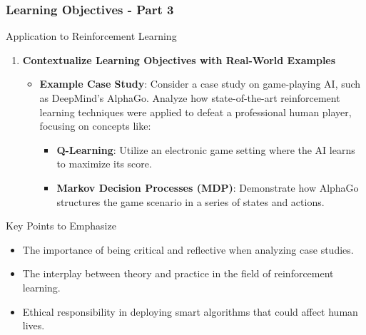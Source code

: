 \documentclass[aspectratio=169]{beamer}
\begin{document}
\begin{frame}[fragile]
    \frametitle{Learning Objectives - Part 3}
    \begin{block}{Application to Reinforcement Learning}
        \begin{enumerate}
            \item \textbf{Contextualize Learning Objectives with Real-World Examples}
                \begin{itemize}
                    \item \textbf{Example Case Study}: Consider a case study on game-playing AI, such as DeepMind’s AlphaGo. Analyze how state-of-the-art reinforcement learning techniques were applied to defeat a professional human player, focusing on concepts like:
                        \begin{itemize}
                            \item \textbf{Q-Learning}: Utilize an electronic game setting where the AI learns to maximize its score.
                            \item \textbf{Markov Decision Processes (MDP)}: Demonstrate how AlphaGo structures the game scenario in a series of states and actions.
                        \end{itemize}
                \end{itemize}
        \end{enumerate}
    \end{block}
    \begin{block}{Key Points to Emphasize}
        \begin{itemize}
            \item The importance of being critical and reflective when analyzing case studies.
            \item The interplay between theory and practice in the field of reinforcement learning.
            \item Ethical responsibility in deploying smart algorithms that could affect human lives.
        \end{itemize}
    \end{block}
\end{frame}
\end{document}
